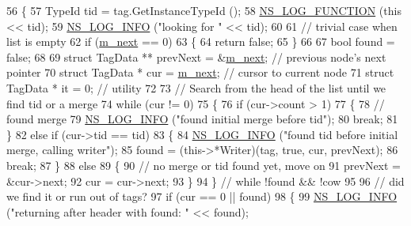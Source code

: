 \begin{DoxyCode}
56 \{
57   TypeId tid = tag.GetInstanceTypeId ();
58   \hyperlink{log-macros-disabled_8h_a90b90d5bad1f39cb1b64923ea94c0761}{NS\_LOG\_FUNCTION} (\textcolor{keyword}{this} << tid);
59   \hyperlink{group__logging_gafbd73ee2cf9f26b319f49086d8e860fb}{NS\_LOG\_INFO}     (\textcolor{stringliteral}{"looking for "} << tid);
60 
61   \textcolor{comment}{// trivial case when list is empty}
62   \textcolor{keywordflow}{if} (\hyperlink{classns3_1_1PacketTagList_a69e3eca2ef2793ab142ecd2b2ede4ead}{m\_next} == 0)
63     \{
64       \textcolor{keywordflow}{return} \textcolor{keyword}{false};
65     \}
66 
67   \textcolor{keywordtype}{bool} found = \textcolor{keyword}{false};
68 
69   \textcolor{keyword}{struct }TagData ** prevNext = &\hyperlink{classns3_1_1PacketTagList_a69e3eca2ef2793ab142ecd2b2ede4ead}{m\_next}; \textcolor{comment}{// previous node's next pointer}
70   \textcolor{keyword}{struct }TagData  * cur      =  \hyperlink{classns3_1_1PacketTagList_a69e3eca2ef2793ab142ecd2b2ede4ead}{m\_next}; \textcolor{comment}{// cursor to current node}
71   \textcolor{keyword}{struct }TagData  * it = 0;             \textcolor{comment}{// utility}
72 
73   \textcolor{comment}{// Search from the head of the list until we find tid or a merge}
74   \textcolor{keywordflow}{while} (cur != 0)
75     \{
76       \textcolor{keywordflow}{if} (cur->count > 1)
77         \{
78           \textcolor{comment}{// found merge}
79           \hyperlink{group__logging_gafbd73ee2cf9f26b319f49086d8e860fb}{NS\_LOG\_INFO} (\textcolor{stringliteral}{"found initial merge before tid"});
80           \textcolor{keywordflow}{break};
81         \}
82       \textcolor{keywordflow}{else} \textcolor{keywordflow}{if} (cur->tid == tid)
83         \{
84           \hyperlink{group__logging_gafbd73ee2cf9f26b319f49086d8e860fb}{NS\_LOG\_INFO} (\textcolor{stringliteral}{"found tid before initial merge, calling writer"});
85           found = (this->*Writer)(tag, \textcolor{keyword}{true}, cur, prevNext);
86           \textcolor{keywordflow}{break};
87         \}
88       \textcolor{keywordflow}{else}
89         \{
90           \textcolor{comment}{// no merge or tid found yet, move on}
91           prevNext = &cur->next;
92           cur      =  cur->next;
93         \}
94     \}  \textcolor{comment}{// while !found && !cow}
95 
96   \textcolor{comment}{// did we find it or run out of tags?}
97   \textcolor{keywordflow}{if} (cur == 0 || found)
98     \{
99       \hyperlink{group__logging_gafbd73ee2cf9f26b319f49086d8e860fb}{NS\_LOG\_INFO} (\textcolor{stringliteral}{"returning after header with found: "} << found);

\end{DoxyCode}
